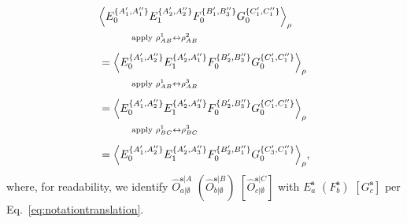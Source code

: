 \documentclass[superscriptaddress,aps,prx,nofootinbib,twocolumn,twoside,reprint,letterpaper,longbibliography]{revtex4-2}
\DeclarePairedDelimiter{\expec}{\langle}{\rangle}
\begin{document}
\begin{subequations}\begin{align}\label{eq:relabelstatesexample}
  \nonumber&\expec*{E_0^{\{A'_1,A''_1\}}E_1^{\{A'_2,A''_2\}}F_0^{\{B'_1,B''_3\}}G_0^{\{C'_1,C''_1\}}}_\rho\\
  \nonumber&\qquad\quad^{\text{apply }\rho_{AB}^1\leftrightarrow\rho_{AB}^2}\\
  &=\expec*{E_0^{\{A'_1,A''_2\}}E_1^{\{A'_2,A''_1\}}F_0^{\{B'_2,B''_3\}}G_0^{\{C'_1,C''_1\}}}_\rho\\
  \nonumber&\qquad\quad^{\text{apply }\rho_{AB}^1\leftrightarrow\rho_{AB}^3}\\
  &=\expec*{E_0^{\{A'_1,A''_2\}}E_1^{\{A'_2,A''_3\}}F_0^{\{B'_2,B''_3\}}G_0^{\{C'_1,C''_1\}}}_\rho\\
  \nonumber&\qquad\quad^{\text{apply }\rho_{BC}^1\leftrightarrow\rho_{BC}^3}\\
  &=\expec*{E_0^{\{A'_1,A''_2\}}E_1^{\{A'_2,A''_3\}}F_0^{\{B'_2,B''_1\}}G_0^{\{C'_3,C''_1\}}}_\rho,
\end{align}\end{subequations}
\noindent where, for readability, we identify ${\hat{O}^{\boldsymbol{s}|A}_{a|\emptyset}}$ ${(\hat{O}^{\boldsymbol{s}|B}_{b|\emptyset})}$ ${[\hat{O}^{\boldsymbol{s}|C}_{c|\emptyset}]}$ with $E^{\boldsymbol{s}}_a$ ${(F^{\boldsymbol{s}}_b)}$ ${[G^{\boldsymbol{s}}_c]}$ per Eq.~\eqref{eq:notationtranslation}.
\end{document}
